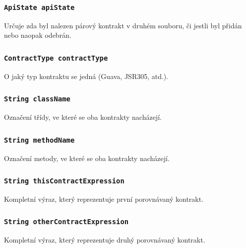 			\subsubsection{\texttt{ApiState apiState}}
				Určuje zda byl nalezen párový kontrakt v druhém souboru, či jestli byl přidán nebo naopak odebrán.
				
			\subsubsection{\texttt{ContractType contractType}}
				O jaký typ kontraktu se jedná (Guava, JSR305, atd.).
				
			\subsubsection{\texttt{String className}}
				Označení třídy, ve které se oba kontrakty nacházejí.
				
			\subsubsection{\texttt{String methodName}}
				Označení metody, ve které se oba kontrakty nacházejí.
				
			\subsubsection{\texttt{String thisContractExpression}}
				Kompletní výraz, který reprezentuje první porovnávaný kontrakt.
				
			\subsubsection{\texttt{String otherContractExpression}}
				Kompletní výraz, který reprezentuje druhý porovnávaný kontrakt.
			
